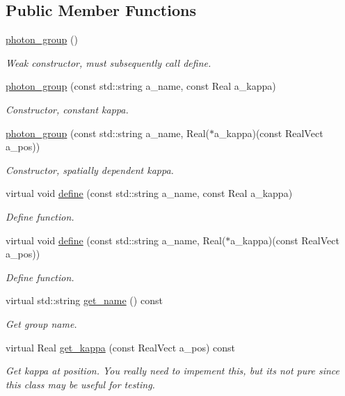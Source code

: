 \subsection*{Public Member Functions}
\begin{DoxyCompactItemize}
\item 
\hyperlink{classphoton__group_a5ad58bbd0e2159022cc6e9902598ac37}{photon\+\_\+group} ()
\begin{DoxyCompactList}\small\item\em Weak constructor, must subsequently call define. \end{DoxyCompactList}\item 
\hyperlink{classphoton__group_a0ab8c04d58002e9c77d17554edd928dc}{photon\+\_\+group} (const std\+::string a\+\_\+name, const Real a\+\_\+kappa)
\begin{DoxyCompactList}\small\item\em Constructor, constant kappa. \end{DoxyCompactList}\item 
\hyperlink{classphoton__group_a0bc0d52673d7f8dc77d541ca908580f2}{photon\+\_\+group} (const std\+::string a\+\_\+name, Real($\ast$a\+\_\+kappa)(const Real\+Vect a\+\_\+pos))
\begin{DoxyCompactList}\small\item\em Constructor, spatially dependent kappa. \end{DoxyCompactList}\item 
virtual void \hyperlink{classphoton__group_a42205c73cd50513b8fa2708fb25988ab}{define} (const std\+::string a\+\_\+name, const Real a\+\_\+kappa)
\begin{DoxyCompactList}\small\item\em Define function. \end{DoxyCompactList}\item 
virtual void \hyperlink{classphoton__group_a32db7a07fc355cb35b3ee7e2039e045e}{define} (const std\+::string a\+\_\+name, Real($\ast$a\+\_\+kappa)(const Real\+Vect a\+\_\+pos))
\begin{DoxyCompactList}\small\item\em Define function. \end{DoxyCompactList}\item 
virtual std\+::string \hyperlink{classphoton__group_a5abcaf8edcabaeb3c47dad206c99c450}{get\+\_\+name} () const 
\begin{DoxyCompactList}\small\item\em Get group name. \end{DoxyCompactList}\item 
virtual Real \hyperlink{classphoton__group_af62473f6ce4611f27ce857681b0c2541}{get\+\_\+kappa} (const Real\+Vect a\+\_\+pos) const 
\begin{DoxyCompactList}\small\item\em Get kappa at position. You really need to impement this, but it\textquotesingle{}s not pure since this class may be useful for testing. \end{DoxyCompactList}\end{DoxyCompactItemize}
